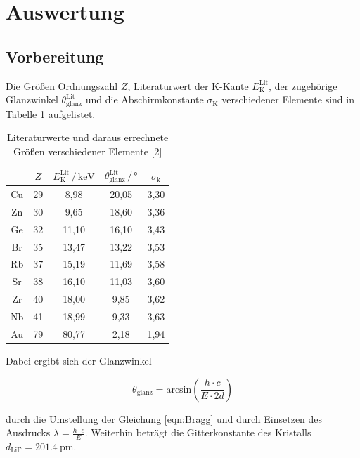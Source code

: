 \section{Auswertung}
\label{sec:Auswertung}

\subsection{Vorbereitung}

Die Größen Ordnungszahl $Z$, Literaturwert der
K-Kante $E_\text{K}^\text{Lit}$, der zugehörige Glanzwinkel 
$\theta_\text{glanz}^\text{Lit}$ und die Abschirmkonstante 
$\sigma_\text{K}$ verschiedener Elemente sind in Tabelle 
\ref{tab:literatur} aufgelistet.

\begin{table}
  \centering
  \caption{Literaturwerte und daraus errechnete Größen verschiedener Elemente [2]}
  \label{tab:literatur}
  \begin{tabular}{c c c c c}
  \toprule
  $ $ & $Z$ & $E_\text{K}^\text{Lit} \,/\, \si{\kilo\eV}$
  & $\theta_\text{glanz}^\text{Lit} \,/\, \si{\degree}$ & 
  $\sigma_\text{k}$\\
  \midrule 
  Cu & 29 &  8,98 & 20,05 & 3,30 \\
  Zn & 30 &  9,65 & 18,60 & 3,36 \\
  Ge & 32 & 11,10 & 16,10 & 3,43 \\
  Br & 35 & 13,47 & 13,22 & 3,53 \\
  Rb & 37 & 15,19 & 11,69 & 3,58 \\
  Sr & 38 & 16,10 & 11,03 & 3,60 \\
  Zr & 40 & 18,00 &  9,85 & 3,62 \\
  Nb & 41 & 18,99 &  9,33 & 3,63 \\
  Au & 79 & 80,77 &  2,18 & 1,94 \\
  \bottomrule
  \end{tabular}
  \end{table}

Dabei ergibt sich der Glanzwinkel

  \begin{equation}
    \theta_\text{glanz} = \text{arcsin}\left(\frac{h \cdot c}{E \cdot 2d}\right)
    \label{eqn:theta}
  \end{equation}

  durch die Umstellung der Gleichung \eqref{eqn:Bragg} und durch Einsetzen 
  des Ausdrucks $\lambda = \frac{h \cdot c}{E}$. Weiterhin beträgt die Gitterkonstante
  des Kristalls $d_\text{LiF} = \SI{201.4}{\pico\meter}$.

